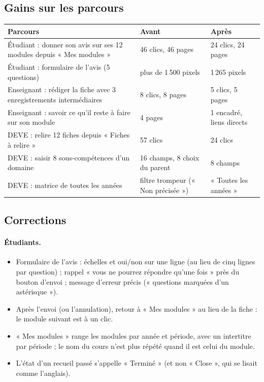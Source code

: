 \documentclass[11pt,a4paper]{article}
\begin{document}
\subsection{Gains sur les parcours}

\begin{center}
\small
\begin{tabularx}{\linewidth}{@{}X l l@{}}
\toprule
\textbf{Parcours} & \textbf{Avant} & \textbf{Après} \\
\midrule
Étudiant : donner son avis sur ses 12 modules depuis « Mes modules » & 46 clics, 46 pages & 24 clics, 24 pages \\
Étudiant : formulaire de l'avis (5 questions) & plus de 1\,500 pixels & 1\,265 pixels \\
Enseignant : rédiger la fiche avec 3 enregistrements intermédiaires & 8 clics, 8 pages & 5 clics, 5 pages \\
Enseignant : savoir ce qu'il reste à faire sur son module & 4 pages & 1 encadré, liens directs \\
DEVE : relire 12 fiches depuis « Fiches à relire » & 57 clics & 24 clics \\
DEVE : saisir 8 sous-compétences d'un domaine & 16 champs, 8 choix du parent & 8 champs \\
DEVE : matrice de toutes les années & filtre trompeur (« Non précisée ») & « Toutes les années » \\
\bottomrule
\end{tabularx}
\end{center}

\subsection{Corrections}

\paragraph{Étudiants.}
\begin{itemize}
  \item Formulaire de l'avis : échelles et oui/non sur une ligne (au lieu de cinq lignes par
    question) ; rappel « vous ne pourrez répondre qu'une fois » près du bouton d'envoi ; message
    d'erreur précis (« questions marquées d'un astérisque »).
  \item Après l'envoi (ou l'annulation), retour à « Mes modules » au lieu de la fiche : le module
    suivant est à un clic.
  \item « Mes modules » range les modules par année et période, avec un intertitre par période ;
    le nom du cours n'est plus répété quand il est celui du module.
  \item L'état d'un recueil passé s'appelle « Terminé » (et non « Close », qui se lisait comme
    l'anglais).
\end{itemize}
\end{document}
